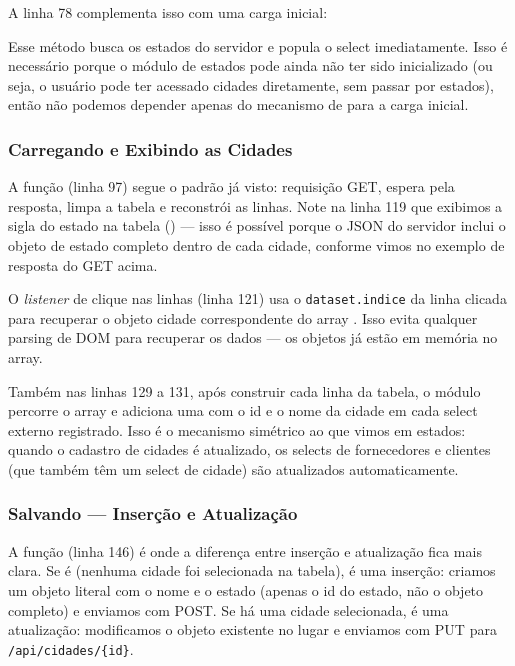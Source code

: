 A linha 78 complementa isso com uma carga inicial:


Esse método busca os estados do servidor e popula o select imediatamente. Isso é necessário porque o módulo de estados pode ainda não ter sido inicializado (ou seja, o usuário pode ter acessado cidades diretamente, sem passar por estados), então não podemos depender apenas do mecanismo de  para a carga inicial.

\subsubsection{Carregando e Exibindo as Cidades}

A função  (linha 97) segue o padrão já visto: requisição GET, espera pela resposta, limpa a tabela e reconstrói as linhas. Note na linha 119 que exibimos a sigla do estado na tabela () --- isso é possível porque o JSON do servidor inclui o objeto de estado completo dentro de cada cidade, conforme vimos no exemplo de resposta do GET acima.

O \textit{listener} de clique nas linhas (linha 121) usa o \texttt{dataset.indice} da linha clicada para recuperar o objeto cidade correspondente do array . Isso evita qualquer parsing de DOM para recuperar os dados --- os objetos já estão em memória no array.

Também nas linhas 129 a 131, após construir cada linha da tabela, o módulo percorre o array  e adiciona uma  com o id e o nome da cidade em cada select externo registrado. Isso é o mecanismo simétrico ao que vimos em estados: quando o cadastro de cidades é atualizado, os selects de fornecedores e clientes (que também têm um select de cidade) são atualizados automaticamente.

\subsubsection{Salvando --- Inserção e Atualização}

A função  (linha 146) é onde a diferença entre inserção e atualização fica mais clara. Se  é  (nenhuma cidade foi selecionada na tabela), é uma inserção: criamos um objeto literal com o nome e o estado (apenas o id do estado, não o objeto completo) e enviamos com POST. Se há uma cidade selecionada, é uma atualização: modificamos o objeto existente no lugar e enviamos com PUT para \texttt{/api/cidades/\{id\}}.

